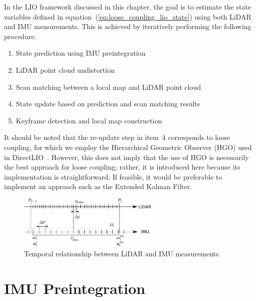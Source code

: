 In the LIO framework discussed in this chapter, the goal is to estimate the state variables defined in equation~(\ref{eq:loose_coupling_lio_state}) using both LiDAR and IMU measurements.
This is achieved by iteratively performing the following procedure.
%
\begin{enumerate}
  \item State prediction using IMU preintegration
  \item LiDAR point cloud undistortion
  \item Scan matching between a local map and LiDAR point cloud
  \item State update based on prediction and scan matching results
  \item Keyframe detection and local map construction
\end{enumerate}
%
It should be noted that the re-update step in item~4 corresponds to loose coupling, for which we employ the Hierarchical Geometric Observer (HGO) used in DirectLIO~\cite{DirectLIO, Lopez2023arXiv}.
However, this does not imply that the use of HGO is necessarily the best approach for loose coupling; rather, it is introduced here because its implementation is straightforward.
If feasible, it would be preferable to implement an approach such as the Extended Kalman Filter.

\begin{figure}[!t]
  \centering
  \includegraphics[width=0.6\textwidth]{../figs/time_relationships.pdf}
  \caption{Temporal relationship between LiDAR and IMU measurements.}
  \label{fig:time_relationships}
\end{figure}
















\section{IMU Preintegration}
\label{subsec:imu_preintegration}

